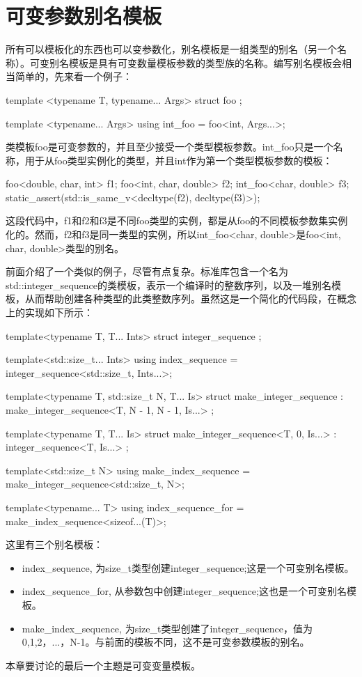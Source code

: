 \section{可变参数别名模板}
所有可以模板化的东西也可以变参数化，别名模板是一组类型的别名（另一个名称）。可变别名模板是具有可变数量模板参数的类型族的名称。编写别名模板会相当简单的，先来看一个例子：

\begin{cpp}
template <typename T, typename... Args>
struct foo
{
};

template <typename... Args>
using int_foo = foo<int, Args...>;
\end{cpp}

类模板foo是可变参数的，并且至少接受一个类型模板参数。int\_foo只是一个名称，用于从foo类型实例化的类型，并且int作为第一个类型模板参数的模板：

\begin{cpp}
foo<double, char, int> f1;
foo<int, char, double> f2;
int_foo<char, double> f3;
static_assert(std::is_same_v<decltype(f2), decltype(f3)>);
\end{cpp}

这段代码中，f1和f2和f3是不同foo类型的实例，都是从foo的不同模板参数集实例化的。然而，f2和f3是同一类型的实例，所以int\_foo<char, double>是foo<int, char, double>类型的别名。

前面介绍了一个类似的例子，尽管有点复杂。标准库包含一个名为std::integer\_sequence的类模板，表示一个编译时的整数序列，以及一堆别名模板，从而帮助创建各种类型的此类整数序列。虽然这是一个简化的代码段，在概念上的实现如下所示：

\begin{cpp}
template<typename T, T... Ints>
struct integer_sequence
{};

template<std::size_t... Ints>
using index_sequence = integer_sequence<std::size_t,
								        Ints...>;

template<typename T, std::size_t N, T... Is>
struct make_integer_sequence :
	make_integer_sequence<T, N - 1, N - 1, Is...>
{};

template<typename T, T... Is>
struct make_integer_sequence<T, 0, Is...> :
	integer_sequence<T, Is...>
{};

template<std::size_t N>
using make_index_sequence = make_integer_sequence<std::size_t,
												  N>;

template<typename... T>
using index_sequence_for =
	make_index_sequence<sizeof...(T)>;
\end{cpp}

这里有三个别名模板：

\begin{itemize}
  \item index\_sequence, 为size\_t类型创建integer\_sequence;这是一个可变别名模板。
  \item index\_sequence\_for, 从参数包中创建integer\_sequence;这也是一个可变别名模板。
  \item make\_index\_sequence, 为size\_t类型创建了integer\_sequence，值为0,1,2，...，N-1。与前面的模板不同，这不是可变参数模板的别名。
\end{itemize}

本章要讨论的最后一个主题是可变变量模板。










